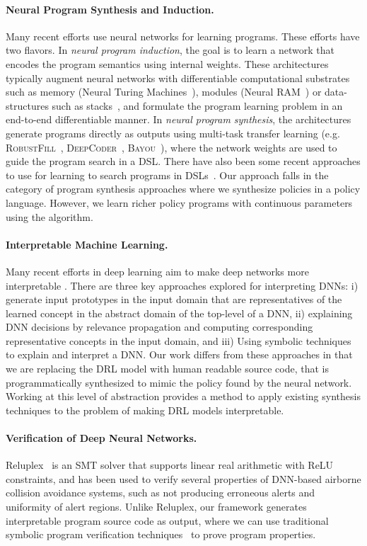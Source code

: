 \paragraph{Neural Program Synthesis and Induction.} Many recent efforts use neural networks for learning programs. These efforts have two flavors. In \emph{neural program induction}, the goal is to learn a network that encodes the program semantics using internal weights. These architectures typically augment neural networks with differentiable computational substrates such as memory (Neural Turing Machines~\cite{ntm}), modules (Neural RAM~\cite{nram}) or data-structures such as stacks~\cite{stackrnn}, and formulate the program learning problem in an end-to-end differentiable manner. In \emph{neural program synthesis}, the architectures generate programs directly as outputs using multi-task transfer learning (e.g. \textsc{RobustFill}~\cite{RobustFill}, \textsc{DeepCoder}~\cite{DeepCoder}, \textsc{Bayou}~\cite{Bayou}), where the network weights are used to guide the program search in a DSL. There have also been some recent approaches to use \rl for learning to search programs in DSLs~\cite{rlkarel,rlbf}. Our approach falls in the category of program synthesis approaches where we synthesize policies in a policy language. However, we learn richer policy programs with continuous parameters using the \algo algorithm.
\paragraph{Interpretable Machine Learning.} Many recent efforts in deep learning aim to make deep networks more interpretable \citep{NN:Understanding,NN:Mythos, SymbolicRL, SymbRL2, SymbRL3, SymbRL4}. There are three key approaches explored for interpreting DNNs: i) generate input prototypes in the input domain that are representatives of the learned concept in the abstract domain of the top-level of a DNN, ii) explaining DNN decisions by relevance propagation and computing corresponding representative concepts in the input domain, and iii) Using symbolic techniques to explain and interpret a DNN. 
Our work differs from these approaches in that we are replacing the DRL model with human readable source code, that is programmatically synthesized to mimic the policy found by the neural network. Working at this level of abstraction provides a method to apply existing synthesis techniques to the problem of making DRL models interpretable.
\paragraph{Verification of Deep Neural Networks.} Reluplex~\cite{reluplex} is an SMT solver that supports linear real arithmetic with ReLU constraints, and has been used to verify several properties of DNN-based airborne collision avoidance systems, such as not producing erroneous alerts and uniformity of alert regions. Unlike Reluplex, our framework generates interpretable program source code as output, where we can use traditional symbolic program verification techniques~\cite{king1976symbolic} to prove program properties.
